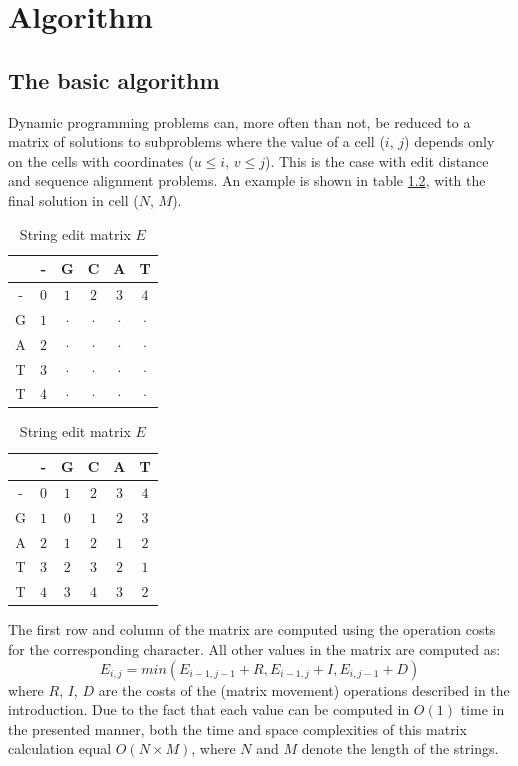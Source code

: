 \documentclass[times, utf8, seminar, numeric]{fer}
\begin{document}
\chapter{Algorithm}
\section{The basic algorithm}
Dynamic programming problems can, more often than not, be reduced to a matrix of solutions to subproblems where the value of a cell ($i$, $j$) depends only on the cells with coordinates ($u\leq i$, $v\leq j$). This is the case with edit distance and sequence alignment problems. An example is shown in table \ref{tab:a}, with the final solution in cell ($N$, $M$).
\begin{table}[H]
\centering
\begin{tabular}{c|ccccc}
  & - & G & C & A & T\\
\hline
- & $0$ & $1$ & $2$ & $3$ & $4$ \\
G & $1$ & $\cdot$ & $\cdot$ & $\cdot$ & $\cdot$ \\
A & $2$ & $\cdot$ & $\cdot$ & $\cdot$ & $\cdot$ \\
T & $3$ & $\cdot$ & $\cdot$ & $\cdot$ & $\cdot$ \\
T & $4$ & $\cdot$ & $\cdot$ & $\cdot$ & $\cdot$ \\
\end{tabular}
\quad\quad
\begin{tabular}{c|ccccc}
  & - & G & C & A & T\\
\hline
- & $0$ & $1$ & $2$ & $3$ & $4$ \\
G & $1$ & $0$ & $1$ & $2$ & $3$ \\
A & $2$ & $1$ & $2$ & $1$ & $2$ \\
T & $3$ & $2$ & $3$ & $2$ & $1$ \\
T & $4$ & $3$ & $4$ & $3$ & $2$ \\
\end{tabular}
\caption{String edit matrix $E$}\label{tab:a}
\end{table}

The first row and column of the matrix are computed using the operation costs for the corresponding character. All other values in the matrix are computed as:
\begin{equation}
E_{i,j} = min(E_{i-1, j-1} + R, E_{i-1, j} + I, E_{i, j - 1} + D)
\end{equation}
where $R$, $I$, $D$ are the costs of the (matrix movement) operations described in the introduction.
Due to the fact that each value can be computed in $O(1)$ time in the presented manner, both the time and space complexities of this matrix calculation equal $O(N \times M)$, where $N$ and $M$ denote the length of the strings.
\end{document}
